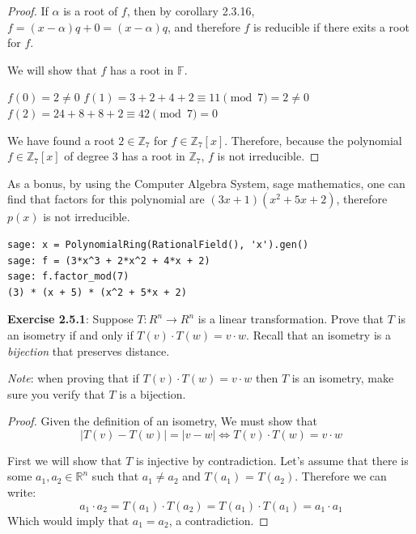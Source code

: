 \documentclass[a4paper]{article}
\begin{document}
\begin{myparindent}{0pt}
\begin{proof}
  If $\alpha$ is a root of $f$, then by corollary 2.3.16,
  $f = (x - \alpha)q + 0 = (x - \alpha)q$, and therefore $f$ is reducible if
  there exits a root for $f$. \newline

  We will show that $f$ has a root in $\mathbb{F}$. \newline

  $f(0) = 2 \neq 0$ \newline
  $f(1) = 3 + 2 + 4 + 2 \equiv 11 \pmod 7 = 2 \neq 0$ \newline
  $f(2) = 24 + 8 + 8 + 2 \equiv 42 \pmod 7 = 0$ \newline

  We have found a root $2 \in \mathbb{Z}_7$ for $f \in \mathbb{Z}_7[x]$.
  Therefore, because the polynomial $f \in \mathbb{Z}_7[x]$ of degree 3 has a
  root in $\mathbb{Z}_7$, $f$ is not irreducible.
\end{proof}

As a bonus, by using the Computer Algebra System, sage mathematics,
one can find that factors for this polynomial are $(3x + 1)(x^2 + 5x + 2)$,
therefore $p(x)$ is not irreducible.

\begin{verbatim}
sage: x = PolynomialRing(RationalField(), 'x').gen()
sage: f = (3*x^3 + 2*x^2 + 4*x + 2)
sage: f.factor_mod(7)
(3) * (x + 5) * (x^2 + 5*x + 2)
\end{verbatim}

\textbf{Exercise 2.5.1}:
Suppose $T:R^n \rightarrow R^n$ is a linear transformation. Prove that $T$ is
an isometry if and only if $T(v) \cdot T(w) = v \cdot w$. Recall that an
isometry is a \textit{bijection} that preserves distance.

\textit{Note}: when proving that if $T(v) \cdot T(w) = v \cdot w$ then $T$ is
an isometry, make sure you verify that $T$ is a bijection.
\newline
\begin{proof}
  Given the definition of an isometry, We must show that
  \[
    |T(v) - T(w)| = |v - w| \iff T(v) \cdot T(w) = v \cdot w
  \]

  First we will show that $T$ is injective by contradiction. Let's assume that
  there is some $a_1, a_2 \in \mathbb{R}^n$ such that $a_1 \neq a_2$ and
  $T(a_1)$ = $T(a_2)$. Therefore we can write:
  \[ a_1 \cdot a_2 = T(a_1) \cdot T(a_2) = T(a_1) \cdot T(a_1) = a_1 \cdot a_1 \]
  Which would imply that $a_1 = a_2$, a contradiction. \newline


\end{proof}
\end{myparindent}
\end{document}

